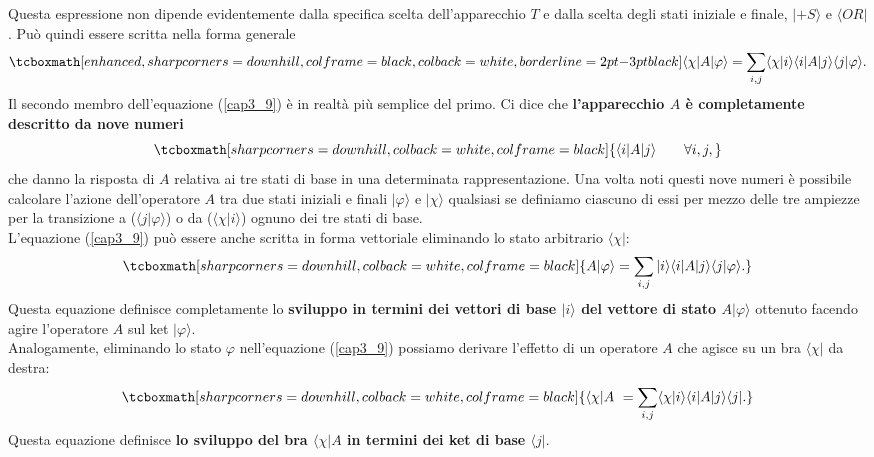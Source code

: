 Questa espressione non dipende evidentemente dalla specifica scelta dell'apparecchio $T$ e dalla scelta degli stati iniziale e finale, $| +S \rangle $ e $\langle OR |$. Può quindi essere scritta nella forma generale
	\begin{equation}
		\tcboxmath[enhanced, sharp corners=downhill, colframe=black, colback=white, borderline={2pt}{-3pt}{black}]{
			\langle \chi | A | \varphi \rangle = \sum \limits_{i,j} \langle \chi | i \rangle \langle i | A | j \rangle \langle j | \varphi \rangle .
			}
	\label{cap3_9}
	\end{equation}
Il secondo membro dell'equazione (\ref{cap3_9}) è in realtà più semplice del primo. Ci dice che \textbf{l'apparecchio $A$ è completamente descritto da nove numeri}
	\begin{equation}
		\tcboxmath[sharp corners=downhill, colback=white, colframe=black]{
			\langle i | A | j \rangle  \qquad \forall i,j ,
			}
	\end{equation}
che danno la risposta di $A$ relativa ai tre stati di base in una determinata rappresentazione. Una volta noti questi nove numeri è possibile calcolare l'azione dell'operatore $A$ tra due stati iniziali e finali $| \varphi \rangle $ e $| \chi \rangle$ qualsiasi se definiamo ciascuno di essi per mezzo delle tre ampiezze per la transizione a ($\langle j | \varphi \rangle $) o da ($\langle \chi | i \rangle$) ognuno dei tre stati di base.\\

L'equazione (\ref{cap3_9}) può essere anche scritta in forma vettoriale eliminando lo stato arbitrario $\langle \chi | $:
	\begin{equation}
		\tcboxmath[sharp corners=downhill, colback=white, colframe=black]{
			A| \varphi \rangle = \sum \limits_{i,j}  |i \rangle \langle i | A | j \rangle \langle j | \varphi \rangle .
			}
	\label{cap3_10}
	\end{equation}
Questa equazione definisce completamente lo \textbf{sviluppo in termini dei vettori di base $ | i \rangle$ del vettore di stato $A | \varphi \rangle $} ottenuto facendo agire l'operatore $A$ sul ket $ | \varphi \rangle$.\\

Analogamente, eliminando lo stato $\varphi$ nell'equazione (\ref{cap3_9}) possiamo derivare l'effetto di un operatore $A$ che agisce su un bra $ \langle \chi |$ da destra:
	\begin{equation}
		\tcboxmath[sharp corners=downhill, colback=white, colframe=black]{
			\langle \chi | A\ = \sum \limits_{i,j} \langle \chi | i \rangle \langle i | A  | j \rangle \langle j | .
			}	
	\label{cap3_11}
	\end{equation}
Questa equazione definisce \textbf{lo sviluppo del bra $\langle \chi |A$ in termini dei ket di base $\langle j |$}.\\

